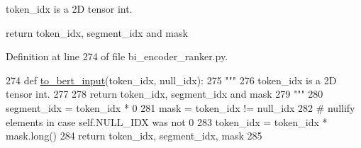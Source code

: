 \begin{DoxyVerb}token_idx is a 2D tensor int.

return token_idx, segment_idx and mask
\end{DoxyVerb}
 

Definition at line 274 of file bi\+\_\+encoder\+\_\+ranker.\+py.


\begin{DoxyCode}
274 \textcolor{keyword}{def }\hyperlink{namespaceparlai_1_1agents_1_1bert__ranker_1_1bi__encoder__ranker_afd88e1e1699d975ab19ea38e8ae77e20}{to\_bert\_input}(token\_idx, null\_idx):
275     \textcolor{stringliteral}{"""}
276 \textcolor{stringliteral}{    token\_idx is a 2D tensor int.}
277 \textcolor{stringliteral}{}
278 \textcolor{stringliteral}{    return token\_idx, segment\_idx and mask}
279 \textcolor{stringliteral}{    """}
280     segment\_idx = token\_idx * 0
281     mask = token\_idx != null\_idx
282     \textcolor{comment}{# nullify elements in case self.NULL\_IDX was not 0}
283     token\_idx = token\_idx * mask.long()
284     \textcolor{keywordflow}{return} token\_idx, segment\_idx, mask
285 \end{DoxyCode}

